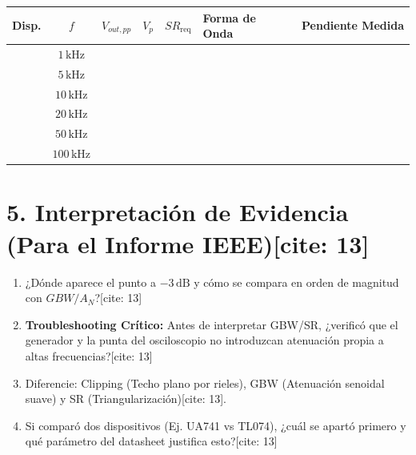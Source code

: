 \documentclass[11pt, a4paper]{article}
\begin{document}
\vspace{0.4cm}
\begin{table}[h!]
    \centering
    \footnotesize
    \renewcommand{\arraystretch}{1.3}
    \begin{tabularx}{\textwidth}{|c|c|c|c|c|>{\centering\arraybackslash}X|>{\centering\arraybackslash}X|}
    \hline
    \textbf{Disp.} & \textbf{$f$} & \textbf{$V_{out,pp}$} & \textbf{$V_p$} & \textbf{$SR_{\mathrm{req}}$} & \textbf{Forma de Onda} & \textbf{Pendiente Medida} \\ \hline
    & $1\,\text{kHz}$ & & & & & \\ \hline
    & $5\,\text{kHz}$ & & & & & \\ \hline
    & $10\,\text{kHz}$ & & & & & \\ \hline
    & $20\,\text{kHz}$ & & & & & \\ \hline
    & $50\,\text{kHz}$ & & & & & \\ \hline
    & $100\,\text{kHz}$ & & & & & \\ \hline
    \end{tabularx}
\end{table}

\section*{5. Interpretación de Evidencia (Para el Informe IEEE)[cite: 13]}
\begin{enumerate}
    \setlength{\itemsep}{0pt}
    \item ¿Dónde aparece el punto a $-3\,\text{dB}$ y cómo se compara en orden de magnitud con $GBW/A_N$?[cite: 13]
    \item \textbf{Troubleshooting Crítico:} Antes de interpretar GBW/SR, ¿verificó que el generador y la punta del osciloscopio no introduzcan atenuación propia a altas frecuencias?[cite: 13]
    \item Diferencie: Clipping (Techo plano por rieles), GBW (Atenuación senoidal suave) y SR (Triangularización)[cite: 13].
    \item Si comparó dos dispositivos (Ej. UA741 vs TL074), ¿cuál se apartó primero y qué parámetro del datasheet justifica esto?[cite: 13]
\end{enumerate}
\end{document}
